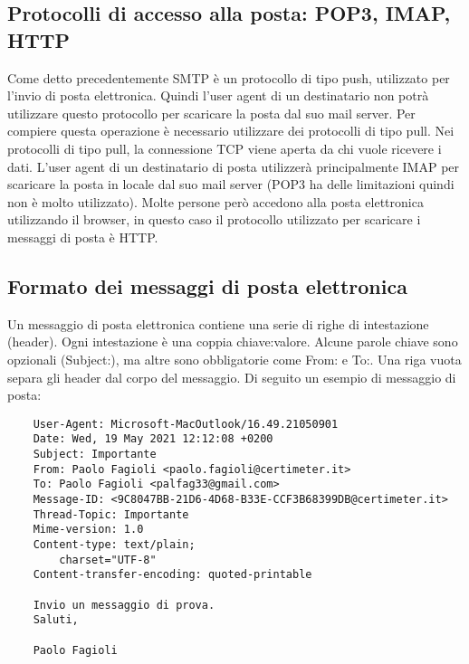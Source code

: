 \subsection{Protocolli di accesso alla posta: POP3, IMAP, HTTP}
Come detto precedentemente SMTP è un protocollo di tipo push, utilizzato per l’invio di posta elettronica. 
Quindi l’user agent di un destinatario non potrà utilizzare questo protocollo per scaricare la posta dal suo mail 
server. Per compiere questa operazione è necessario utilizzare dei protocolli di tipo pull. 
Nei protocolli di tipo pull, la connessione TCP viene aperta da chi vuole ricevere i dati.
L’user agent di un destinatario di posta utilizzerà principalmente IMAP per scaricare la posta in locale dal suo mail server 
(POP3 ha delle limitazioni quindi non è molto utilizzato). 
Molte persone però accedono alla posta elettronica utilizzando il browser, in questo caso il protocollo utilizzato 
per scaricare i messaggi di posta è HTTP.

\pagebreak
\subsection{Formato dei messaggi di posta elettronica}
Un messaggio di posta elettronica contiene una serie di righe di intestazione (header).
Ogni intestazione è una coppia chiave:valore. Alcune parole chiave sono opzionali (Subject:), 
ma altre sono obbligatorie come From: e To:. Una riga vuota separa gli header dal corpo del messaggio.
Di seguito un esempio di messaggio di posta:

\begin{verbatim}
    User-Agent: Microsoft-MacOutlook/16.49.21050901
    Date: Wed, 19 May 2021 12:12:08 +0200
    Subject: Importante
    From: Paolo Fagioli <paolo.fagioli@certimeter.it>
    To: Paolo Fagioli <palfag33@gmail.com>
    Message-ID: <9C8047BB-21D6-4D68-B33E-CCF3B68399DB@certimeter.it>
    Thread-Topic: Importante
    Mime-version: 1.0
    Content-type: text/plain;
        charset="UTF-8"
    Content-transfer-encoding: quoted-printable

    Invio un messaggio di prova.
    Saluti,

    Paolo Fagioli
\end{verbatim}